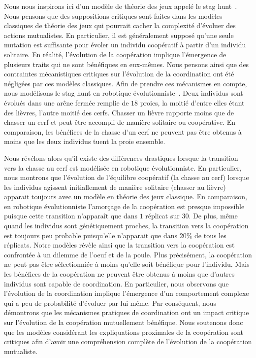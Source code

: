 			Nous nous inspirons ici d'un modèle de théorie des jeux appelé le stag hunt~\parencite{Skyrms2004}. Nous pensons que des suppositions critiques sont faites dans les modèles classiques de théorie des jeux qui pourrait cacher la complexité d'évoluer des actions mutualistes. En particulier, il est généralement supposé qu'une seule mutation est suffisante pour évoler un individu coopératif à partir d'un individu solitaire. En réalité, l'évolution de la coopération implique l'émergence de plusieurs traits qui ne sont bénéfiques en eux-mêmes. Nous pensons ainsi que des contraintes mécanistiques critiques sur l'évolution de la coordination ont été négligées par ces modèles classiques. Afin de prendre ces mécanismes en compte, nous modélisons le stag hunt en robotique évolutionniste~\parencite{Nolfi2000, Doncieux2015}. Deux individus sont évolués dans une arêne fermée remplie de $18$ proies, la moitié d'entre elles étant des lièvres, l'autre moitié des cerfs. Chasser un lièvre rapporte moins que de chasser un cerf et peut être accompli de manière solitaire ou coopérative. En comparaison, les bénéfices de la chasse d'un cerf ne peuvent pas être obtenus à moins que les deux individus tuent la proie ensemble.

			Nous révélons alors qu'il existe des différences drastiques lorsque la transition vers la chasse au cerf est modélisée en robotique évolutionniste. En particulier, nous montrons que l'évolution de l'équilibre coopératif (la chasse au cerf) lorsque les individus agissent initiallement de manière solitaire (chasser au lièvre) apparait toujours avec un modèle en théorie des jeux classique. En comparaison, en robotique évolutionniste l'amorçage de la coopération est presque impossible puisque cette transition n'apparaît que dans $1$ réplicat sur $30$. De plus, même quand les individus sont génétiquement proches, la transition vers la coopération est toujours peu probable puisqu'elle n'apparait que dans 20\% de tous les réplicats. Notre modèles révèle ainsi que la transition vers la coopération est confrontée à un dilemme de l'oeuf et de la poule. Plus précisément, la coopération ne peut pas être sélectionniée à moins qu'elle soit bénéfique pour l'individu. Mais les bénéfices de la coopération ne peuvent être obtenus à moins que d'autres individus sont capable de coordination. En particulier, nous observons que l'évolution de la coordination implique l'émergence d'un comportement complexe qui a peu de probabilité d'évoluer par lui-même. Par conséquent, nous démontrons que les mécanismes pratiques de coordination ont un impact critique sur l'évolution de la coopération mutuellement bénéfique. Nous soutenons donc que les modèles considérant les expliquations proximales de la coopération sont critiques afin d'avoir une compréhension complète de l'évolution de la coopération mutualiste.


